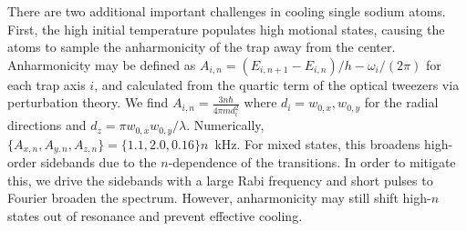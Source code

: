 \documentclass[aps,prl,twocolumn,groupedaddress]{revtex4-1}
\begin{document}
There are two additional important challenges in cooling single sodium atoms.
First, the high initial temperature populates high motional states,
causing the atoms to sample the anharmonicity of the trap away from the center. Anharmonicity may be defined as $A_{i,n}=(E_{i,n+1}-E_{i,n})/h - \omega_i/(2\pi)$ for each trap axis $i$, and calculated from the quartic term of the optical tweezers via perturbation theory.  We find $A_{i,n}=\frac{3n \hbar}{4 \pi m d_i^2}$  where $d_i=w_{0,x},w_{0,y}$ for the radial directions and $d_z=\pi w_{0,x}w_{0,y}/\lambda$.  Numerically, $\{A_{x,n},A_{y,n},A_{z,n}\}=\{1.1, 2.0, 0.16\}n$~kHz. For mixed states, this  broadens high-order sidebands due to the $n$-dependence of the transitions. 
In order to mitigate this, we drive the sidebands with a large  Rabi frequency
and short pulses to Fourier broaden the spectrum. %
However, anharmonicity  may still shift high-$n$ states out of resonance and prevent effective cooling.

\end{document}
